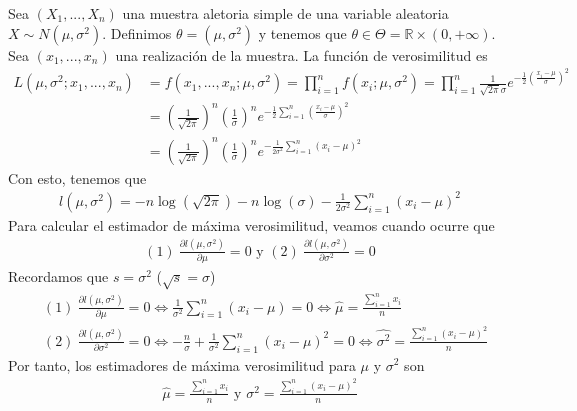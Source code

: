 \begin{ejemplo}
Sea $(X_1,...,X_n)$ una muestra aletoria simple de una variable aleatoria $X \sim N(\mu,\sigma^2)$. Definimos $\theta = (\mu,\sigma^2)$ y tenemos que $\theta \in \Theta = \mathbb{R}\times(0,+\infty)$. Sea $(x_1,...,x_n)$ una realización de la muestra. La función de verosimilitud es
\begin{align*}
    L(\mu,\sigma^2;x_1,...,x_n) &= f(x_1,...,x_n;\mu,\sigma^2) = \prod_{i=1}^{n}{f(x_i;\mu,\sigma^2)} 
    = \prod_{i=1}^{n}{\frac{1}{\sqrt{2\pi}\sigma}}e^{-\frac{1}{2}\left( \frac{x_i -\mu}{\sigma} \right)^2}\\
    &= \left( \frac{1}{\sqrt{2\pi}} \right)^n \left( \frac{1}{\sigma} \right)^n e^{-\frac{1}{2}\sum_{i=1}^{n}{\left( \frac{x_i -\mu}{\sigma} \right)^2}} \\
    &= \left( \frac{1}{\sqrt{2\pi}} \right)^n \left( \frac{1}{\sigma} \right)^n e^{-\frac{1}{2\sigma^2}\sum_{i=1}^{n}{\left( x_i -\mu \right)^2}}
\end{align*}
Con esto, tenemos que
\begin{align*}
    l(\mu,\sigma^2) = -n\log(\sqrt{2\pi}) -n\log(\sigma) - \frac{1}{2\sigma^2}\sum_{i=1}^{n}{\left( x_i -\mu \right)^2}
\end{align*}
Para calcular el estimador de máxima verosimilitud, veamos cuando ocurre que
\begin{align*}
    (1) \ \frac{\partial l(\mu,\sigma^2)}{\partial \mu} = 0 \text{ \ \ \ y \ \ \ } (2) \ \frac{\partial l(\mu,\sigma^2)}{\partial \sigma^2} = 0
\end{align*}
Recordamos que $s = \sigma^2$ ($\sqrt{s} = \sigma$)
\begin{align*}
    &(1) \ \frac{\partial l(\mu,\sigma^2)}{\partial \mu} = 0 \Longleftrightarrow \frac{1}{\sigma^2}\sum_{i=1}^{n}{(x_i -\mu)} = 0 \Longleftrightarrow \hat{\mu} = \frac{\sum_{i=1}^{n}{x_i}}{n} \\
    &(2) \ \frac{\partial l(\mu,\sigma^2)}{\partial \sigma^2} = 0 \Longleftrightarrow -\frac{n}{\sigma} + \frac{1}{\sigma^2}\sum_{i=1}^{n}{(x_i -\mu)^2} = 0 \Longleftrightarrow \hat{\sigma^2} = \frac{\sum_{i=1}^{n}{(x_i -\mu)^2}}{n}
\end{align*}
Por tanto, los estimadores de máxima verosimilitud para $\mu$ y $\sigma^2$ son
\begin{align*}
    \hat{\mu} = \frac{\sum_{i=1}^{n}{x_i}}{n} \text{ \ \ \ y \ \ \ } \hat{\sigma^2} = \frac{\sum_{i=1}^{n}{(x_i -\mu)^2}}{n}
\end{align*}
\end{ejemplo}

